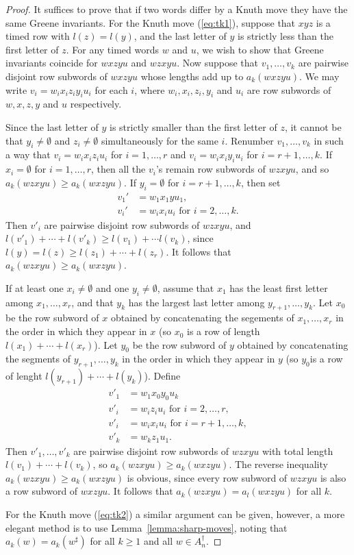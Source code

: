 \documentclass[12pt]{amsart}
\theoremstyle{definition}
\begin{document}
\begin{proof}
  It suffices to prove that if two words differ by a Knuth move they have the same Greene invariants.
  For the Knuth move (\ref{eq:tk1}), suppose that $xyz$ is a timed row with $l(z)=l(y)$, and the last letter of $y$ is strictly less than the first letter of $z$.
  For any timed words $w$ and $u$, we wish to show that Greene invariants coincide for $wxzyu$ and $wzxyu$.
  Now suppose that $v_1,\dotsc,v_k$ are pairwise disjoint row subwords of $wxzyu$ whose lengths add up to $a_k(wxzyu)$.
  We may write $v_i=w_ix_iz_iy_iu_i$ for each $i$, where $w_i,x_i,z_i,y_i$ and $u_i$ are row subwords of $w,x,z,y$ and $u$ respectively.

  Since the last letter of $y$ is strictly smaller than the first letter of $z$, it cannot be that $y_i\neq \emptyset$ and $z_i\neq \emptyset$ simultaneously for the same $i$.
  Renumber $v_1,\dotsc,v_k$ in such a way that $v_i=w_ix_iz_iu_i$ for $i=1,\dotsc,r$ and $v_i=w_ix_iy_iu_i$ for $i=r+1,\dotsc,k$.
  If $x_i=\emptyset$ for $i=1,\dotsc,r$, then all the $v_i$'s remain row subwords of $wzxyu$, and so $a_k(wzxyu)\geq a_k(wxzyu)$.
  If $y_i=\emptyset$ for $i=r+1,\dotsc,k$, then set
  \begin{align*}
    v_1'&=w_1x_1yu_1,\\
    v_i'&=w_ix_iu_i \text{ for } i=2,\dotsc,k.
  \end{align*}
  Then $v'_i$ are pairwise disjoint row subwords of $wzxyu$, and $l(v'_1)+\dotsb + l(v'_k)\geq l(v_1)+\dotsb l(v_k)$, since $l(y)=l(z)\geq l(z_1)+\dotsb + l(z_r)$.
  It follows that $a_k(wzxyu)\geq a_k(wxzyu)$.

  If at least one $x_i\neq \emptyset$ and one $y_i\neq\emptyset$, assume that $x_1$ has the least first letter among $x_1,\dotsc,x_r$, and that $y_k$ has the largest last letter among $y_{r+1},\dotsc,y_k$.
  Let $x_0$ be the row subword of $x$ obtained by concatenating the segements of $x_1,\dotsc,x_r$ in the order in which they appear in $x$ (so $x_0$ is a row of length $l(x_1)+\dotsb + l(x_r)$).
  Let $y_0$ be the row subword of $y$ obtained by concatenating the segments of $y_{r+1},\dotsc, y_k$ in the order in which they appear in $y$ (so $y_0$is a row of lenght $l(y_{r+1})+\dotsb + l(y_k)$).
  Define
  \begin{align*}
    v'_1 &= w_1x_0y_0u_k\\
    v'_i &= w_iz_iu_i \text{ for }i=2,\dotsc,r,\\
    v'_i &= w_ix_iu_i \text{ for } i=r+1,\dotsc,k,\\
    v'_k &= w_kz_1u_1.
  \end{align*}
  Then $v'_1,\dotsc,v'_k$ are pairwise disjoint row subwords of $wzxyu$ with total length $l(v_1)+\dotsb+l(v_k)$, so $a_k(wzxyu)\geq a_k(wxzyu)$.
  The reverse inequality $a_k(wzxyu)\geq a_k(wxzyu)$ is obvious, since every row subword of $wzxyu$ is also a row subword of $wxzyu$.
  It follows that $a_k(wzxyu)=a_l(wxzyu)$ for all $k$.

  For the Knuth move (\ref{eq:tk2}) a similar argument can be given, however, a more elegant method is to use Lemma~\ref{lemma:sharp-moves}, noting that $a_k(w)=a_k(w^\sharp)$ for all $k\geq 1$ and all $w\in A_n^\dagger$.
\end{proof}
\end{document}
